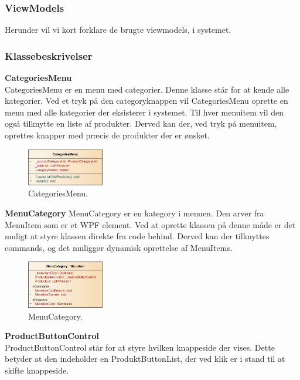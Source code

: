 \subsubsection{ViewModels}
Herunder vil vi kort forklare de brugte viewmodels, i systemet.

\subsubsection{Klassebeskrivelser}
\textbf{CategoriesMenu}\\
CategoriesMenu er en menu med categorier. Denne klasse står for at kende alle kategorier. Ved et tryk på den categoryknappen vil CategoriesMenu oprette en menu med alle kategorier der eksisterer i systemet. Til hver menuitem vil den også tilknytte en liste af produkter. Derved kan der, ved tryk på menuitem, oprettes knapper med præcis de produkter der er ønsket. 

\begin{figure}[H]
	\centering
	\includegraphics[width=0.3\textwidth]{Systemdesign/Frontend/pics/CategoriesMenu}
	\caption{CategoriesMenu.}
	\label{fig:PBC}
\end{figure}

\textbf{MenuCategory}
MenuCategory er en kategory i menuen. Den arver fra MenuItem som er et WPF element. Ved at oprette klassen på denne måde er det muligt at styre klassen direkte fra code behind. Derved kan der tilknyttes commands, og det muliggør dynamisk oprettelse af MenuItems.


\begin{figure}[H]
	\centering
	\includegraphics[width=0.3\textwidth]{Systemdesign/Frontend/pics/MenuCategory}
	\caption{MenuCategory.}
	\label{fig:PBC}
\end{figure}

\textbf{ProductButtonControl} \\
ProductButtonControl står for at styre hvilken knappeside der vises. Dette betyder at den indeholder en ProduktButtonList, der ved klik er i stand til at skifte knappeside.

